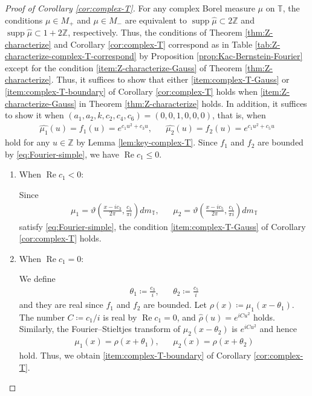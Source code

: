 \documentclass[12pt]{article}
\theoremstyle{definition}
\theoremstyle{remark}
\numberwithin{equation}{section}
\numberwithin{figure}{section}
\numberwithin{table}{section}
\DeclareMathOperator{\supp}{supp}
\DeclareMathOperator{\re}{Re}
\begin{document}
\begin{proof}[Proof of Corollary \ref{cor:complex-T}]

For any complex Borel measure $ \mu $ on $ \mathbb{ T } $, the conditions $ \mu \in M_{ + } $ and $ \mu \in M_{ - } $ are equivalent to $ \supp \hat{ \mu } \subset 2 \mathbb{ Z } $ and $ \supp \hat{ \mu } \subset 1 + 2 \mathbb{ Z } $, respectively.
Thus, the conditions of Theorem \ref{thm:Z-characterize} and Corollary \ref{cor:complex-T} correspond as in Table \ref{tab:Z-characterize-complex-T-correspond} by Proposition \ref{prop:Kac-Bernstein-Fourier} except for the condition \ref{item:Z-characterize-Gauss} of Theorem \ref{thm:Z-characterize}.
Thus, it suffices to show that either \ref{item:complex-T-Gauss} or \ref{item:complex-T-boundary} of Corollary \ref{cor:complex-T} holds when \ref{item:Z-characterize-Gauss} in Theorem \ref{thm:Z-characterize} holds.
In addition, it suffices to show it when $ ( a_1 , a_2 , k , c_2 , c_4 , c_6 ) = ( 0 , 0 , 1 , 0 , 0 , 0 ) $, that is, when
\begin{align}
    \hat{ \mu_1 } ( u ) = f_1 ( u ) = e^{ c_1 u^2 + c_3 u }, & &
    \hat{ \mu_2 } ( u ) = f_2 ( u ) = e^{ c_1 u^2 + c_5 u } \label{eq:Fourier-simple}
\end{align}
hold for any $ u \in \mathbb{ Z } $ by Lemma \ref{lem:key-complex-T}.
Since $ f_1 $ and $ f_2 $ are bounded by \eqref{eq:Fourier-simple}, we have $ \re c_1 \leq 0 $.

\begin{enumerate}[label=(Case \arabic*)]
    \item 
    
    When $ \re c_1 < 0 $:

    Since
\begin{align}
    \mu_1 = \vartheta \left( \frac{ x - i c_3 }{ 2 \pi } , \frac{ c_1 }{ \pi i } \right) dm_{ \mathbb{ T } } , & &
    \mu_2 = \vartheta \left( \frac{ x - i c_5 }{ 2 \pi } , \frac{ c_1 }{ \pi i } \right) dm_{ \mathbb{ T } }
\end{align}
satisfy \eqref{eq:Fourier-simple}, the condition \ref{item:complex-T-Gauss} of Corollary \ref{cor:complex-T} holds.

    \item 

    When $ \re c_1 = 0 $:

    We define
    \begin{align}
    \theta_1 \coloneqq \frac{ c_3 }{ i } , & & \theta_2 \coloneqq \frac{ c_5 }{ i }
\end{align}
and they are real since $ f_1 $ and $ f_2 $ are bounded.
Let $\rho ( x ) \coloneqq \mu_1 ( x - \theta_1 ) $.
The number $ C \coloneqq c_1 / i $ is real by $ \re c_1 = 0 $, and $ \hat{ \rho } ( u ) = e^{ i C u^2 } $ holds.
Similarly, the Fourier--Stieltjes transform of $ \mu_2 ( x - \theta_2 ) $ is $ e^{ i C u^2 } $ and hence
\begin{align}
    \mu_1 ( x ) = \rho ( x + \theta_1 ), & & 
    \mu_2 ( x ) = \rho ( x + \theta_2 )
\end{align}
hold.
Thus, we obtain \ref{item:complex-T-boundary} of Corollary \ref{cor:complex-T}.
\qedhere
\end{enumerate}
    

\end{proof}
\end{document}
